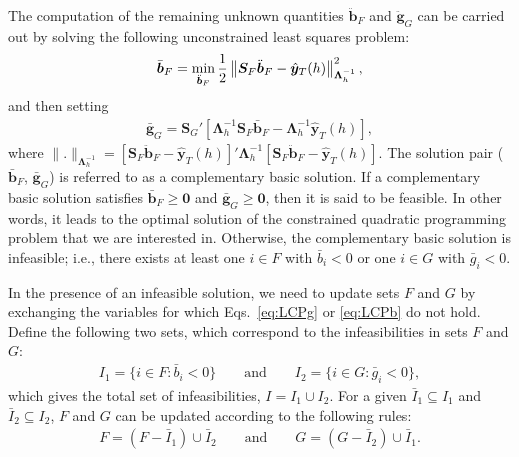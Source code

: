 \documentclass[11pt]{article}
\newcommand{\0}{\phantom{0}}
\begin{document}
The computation of the remaining unknown quantities $\ddot{\bm{b}}_{F}$ and $\ddot{\bm{g}}_{G}$ can be carried out by solving the following unconstrained least squares problem:
\begin{align}
\label{eq:basicquad}
\bar{\bm{b}}_{F} = \operatornamewithlimits{min}_{\ddot{\bm{b}}_{F}} \frac{1}{2}\left\|\bm{S}_{F}\ddot{\bm{b}}_{F} - \hat{\bm{y}}_{T}(h)\right\|^{2}_{\bm{\Lambda}_{h}^{-1}},
\end{align} 
and then setting
\begin{align}
\label{eq:basicgrad}
\bar{\bm{g}}_{G} = \bm{S}_{G}'[\bm{\Lambda}_{h}^{-1}\bm{S}_{F}\bar{\bm{b}}_{F} - \bm{\Lambda}_{h}^{-1}\hat{\bm{y}}_{T}(h)],
\end{align}
where $\|.\|_{\bm{\Lambda}_{h}^{-1}} = [\bm{S}_{F}\ddot{\bm{b}}_{F} - \hat{\bm{y}}_{T}(h)]'\bm{\Lambda}_{h}^{-1} [\bm{S}_{F}\ddot{\bm{b}}_{F} - \hat{\bm{y}}_{T}(h)]$. The solution pair ($\bar{\bm{b}}_{F}$, $\bar{\bm{g}}_{G}$) is referred to as a complementary basic solution. If a complementary basic solution satisfies $\bar{\bm{b}}_{F} \geq \bm{0}$ and $\bar{\bm{g}}_{G} \geq \bm{0}$, then it is said to be feasible. In other words, it leads to the optimal solution of the constrained quadratic programming problem that we are interested in. Otherwise, the complementary basic solution is infeasible; i.e., there exists at least one $i \in F$ with $\bar{b}_{i} < 0$ or one $i \in G$ with $\bar{g}_{i} < 0$.

In the presence of an infeasible solution, we need to update sets $F$ and $G$ by exchanging the variables for which Eqs.\ \eqref{eq:LCPg} or \eqref{eq:LCPb} do not hold. Define the following two sets, which correspond to the infeasibilities in sets $F$ and $G$:
\begin{align}
\label{eq:indexset}
I_{1} = \{i \in F: \bar{b}_{i} < 0\} \qquad \text{and} \qquad I_{2} = \{i \in G: \bar{g}_{i} < 0\},
\end{align}
which gives the total set of infeasibilities, $I = I_{1} \cup I_{2}$. For a given $\bar{I}_{1} \subseteq I_{1}$ and $\bar{I}_{2} \subseteq I_{2}$, $F$ and $G$ can be updated according to the following rules:
\begin{align}
\label{eq:indexsetrev}
F = (F - \bar{I}_{1}) \cup \bar{I}_{2} \qquad \text{and} \qquad G = (G - \bar{I}_{2}) \cup \bar{I}_{1}.
\end{align}
\end{document}
